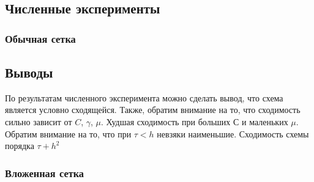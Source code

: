 \subsection{Численные эксперименты}
\subsubsection{Обычная сетка}




























\subsection{Выводы}
По результатам численного эксперимента можно сделать вывод, что схема является условно сходящейся. Также, обратим внимание на то, что сходимость сильно зависит от $C$, $\gamma$, $\mu$. Худшая сходимость при больших $С$ и маленьких $\mu$. Обратим внимание на то, что при $\tau < h$ невзяки наименьшие. Сходимость схемы порядка $\tau + h^2$

\newpage
\subsubsection{Вложенная сетка}


